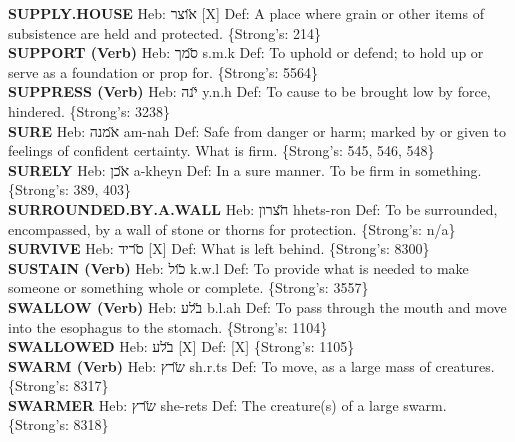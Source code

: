 {\textbf{SUPPLY.HOUSE} Heb: {\large\H אוצר} {[}X{]} Def: A place where grain or other items of subsistence are held and protected. \{Strong's: 214\}\hfill{}\\

\textbf{SUPPORT (Verb)} Heb: {\large\H סמך} s.m.k Def: To uphold or defend; to hold up or serve as a foundation or prop for. \{Strong's: 5564\}\hfill{}\\

\textbf{SUPPRESS (Verb)} Heb: {\large\H ינה} y.n.h Def: To cause to be brought low by force, hindered. \{Strong's: 3238\}\hfill{}\\

\textbf{SURE} Heb: {\large\H אמנה} am-nah Def: Safe from danger or harm; marked by or given to feelings of confident certainty. What is firm. \{Strong's: 545, 546, 548\}\hfill{}\\

\textbf{SURELY} Heb: {\large\H אכן} a-kheyn Def: In a sure manner. To be firm in something. \{Strong's: 389, 403\}\hfill{}\\

\textbf{SURROUNDED.BY.A.WALL} Heb: {\large\H חצרון} hhets-ron Def: To be surrounded, encompassed, by a wall of stone or thorns for protection. \{Strong's: n/a\}\hfill{}\\

\textbf{SURVIVE} Heb: {\large\H סריד} {[}X{]} Def: What is left behind. \{Strong's: 8300\}\hfill{}\\

\textbf{SUSTAIN (Verb)} Heb: {\large\H כול} k.w.l Def: To provide what is needed to make someone or something whole or complete. \{Strong's: 3557\}\hfill{}\\

\textbf{SWALLOW (Verb)} Heb: {\large\H בלע} b.l.ah Def: To pass through the mouth and move into the esophagus to the stomach. \{Strong's: 1104\}\hfill{}\\

\textbf{SWALLOWED} Heb: {\large\H בלע} {[}X{]} Def: {[}X{]} \{Strong's: 1105\}\hfill{}\\

\textbf{SWARM (Verb)} Heb: {\large\H שרץ} sh.r.ts Def: To move, as a large mass of creatures. \{Strong's: 8317\}\hfill{}\\

\textbf{SWARMER} Heb: {\large\H שרץ} she-rets Def: The creature(s) of a large swarm. \{Strong's: 8318\}\hfill{}\\

}

